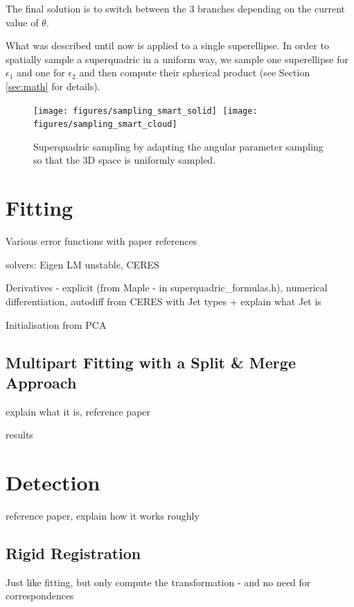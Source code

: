 \documentclass{article}
\begin{document}
The final solution is to switch between the 3 branches depending on the current value of $\theta$.

What was described until now is applied to a single superellipse. In order to spatially sample a superquadric in a uniform way, we sample  one superellipse for $\epsilon_1$ and one for $\epsilon_2$ and then compute their spherical product (see Section \ref{sec:math} for details).

\cite{Pilu95equal-distancesampling}

\begin{figure}
\centering
\texttt{[image: figures/sampling\_smart\_solid]}
\hspace {1cm}
\texttt{[image: figures/sampling\_smart\_cloud]}
\caption {Superquadric sampling by adapting the angular parameter sampling so that the 3D space is uniformly sampled.}
\label{fig:sampling_smart}
\end{figure}



\section {Fitting}
\label{sec:fitting}

Various error functions with paper references

solvers: Eigen LM unstable, CERES

Derivatives - explicit (from Maple - in superquadric\_formulas.h), numerical differentiation, autodiff from CERES with Jet types + explain what Jet is

Initialisation from PCA

\subsection {Multipart Fitting with a Split \& Merge Approach}

explain what it is, reference paper

results




\section {Detection}
\label{sec:detection}

reference paper, explain how it works roughly

\subsection {Rigid Registration}
Just like fitting, but only compute the transformation - and no need for correspondences
\end{document}
